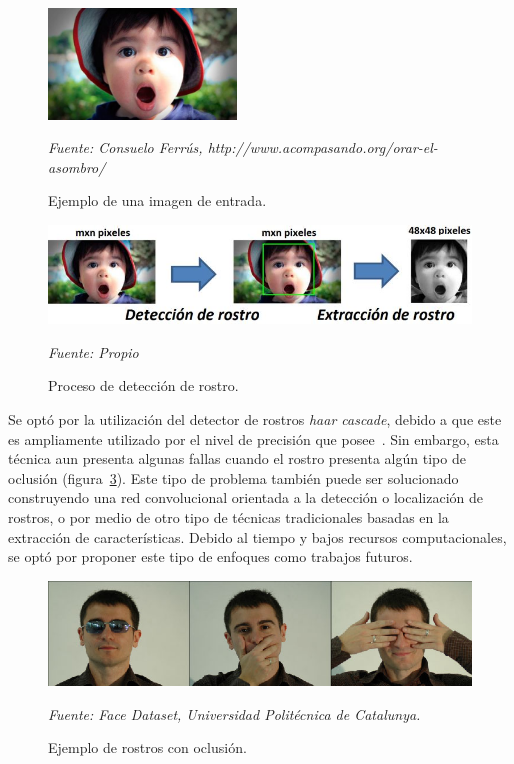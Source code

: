 \begin{figure}[H]
		\centering
		\includegraphics[width=50mm]{Imagenes/imagen_entrada.png}
		\caption{Ejemplo de una imagen de entrada.}
		\vspace{0.15cm}
		\textit{Fuente: Consuelo Ferrús, http://www.acompasando.org/orar-el-asombro/}
		\label{fig:imagen_entrada}
\end{figure}


\begin{figure}[H]
		\centering
		\includegraphics[width=140mm]{Imagenes/proceso_deteccion.png}
		\caption{Proceso de detección de rostro.}
		\vspace{0.15cm}
		\textit{Fuente: Propio}
		\label{fig:proceso_deteccion}
\end{figure}

Se optó por la utilización del detector de rostros \textit{haar cascade}, debido a que este es ampliamente utilizado por el nivel de precisión que posee~\cite{6russakovsky2015imagenet}. Sin embargo, esta técnica aun presenta algunas fallas cuando el rostro presenta algún tipo de oclusión (figura~\ref{fig:oclussion}). Este tipo de problema también puede ser solucionado construyendo una red convolucional orientada a la detección o localización de rostros, o por medio de otro tipo de técnicas tradicionales basadas en la extracción de características. Debido al tiempo y bajos recursos computacionales, se optó por proponer este tipo de enfoques como trabajos futuros.

\begin{figure}[H]
		\centering
		\includegraphics[width=130mm]{Imagenes/oclussion.jpeg}
		\caption{Ejemplo de rostros con oclusión.}
		\vspace{0.15cm}
		\textit{Fuente: Face Dataset, Universidad Politécnica de Catalunya.}
		\label{fig:oclussion}
\end{figure}

